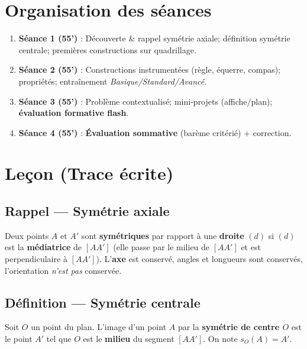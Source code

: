 \section*{Organisation des séances}
\begin{enumerate}
	\item \textbf{Séance 1 (55')} : Découverte \& rappel symétrie axiale; définition symétrie centrale; premières constructions sur quadrillage.
	\item \textbf{Séance 2 (55')} : Constructions instrumentées (règle, équerre, compas); propriétés; entraînement \textit{Basique/Standard/Avancé}.
	\item \textbf{Séance 3 (55')} : Problème contextualisé; mini-projets (affiche/plan); \textbf{évaluation formative flash}.
	\item \textbf{Séance 4 (55')} : \textbf{Évaluation sommative} (barème critérié) + correction.
\end{enumerate}

\section{Leçon (Trace écrite)}
\subsection*{Rappel — Symétrie axiale}
Deux points $A$ et $A'$ sont \textbf{symétriques} par rapport à une \textbf{droite} $(d)$ si $(d)$ est la \textbf{médiatrice} de $[AA']$ (elle passe par le milieu de $[AA']$ et est perpendiculaire à $[AA']$). L’\textbf{axe} est conservé, angles et longueurs sont conservés, l’orientation \emph{n’est pas} conservée.

\subsection*{Définition — Symétrie centrale}
Soit $O$ un point du plan. L’image d’un point $A$ par la \textbf{symétrie de centre $O$} est le point $A'$ tel que $O$ est le \textbf{milieu} du segment $[AA']$. On note $s_O(A)=A'$.

